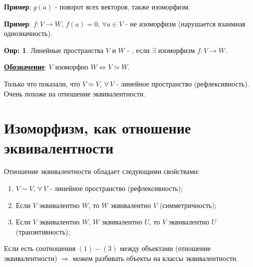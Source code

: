 \documentclass[12pt]{article}
\theoremstyle{definition}
\newtheorem{defn}{Опр:}
\begin{document}
\textbf{Пример}: $g(a)$ - поворот всех векторов, также изоморфизм.

\textbf{Пример}: $f\colon V \to W, \, f(a) = 0, \, \forall a \in V$ - не изоморфизм (нарушается взаимная однозначность).

\begin{defn}
	Линейные пространства $V$ и $W$ - , если $\exists$ изоморфизм $f \colon V \to W$.
\end{defn}

\uline{\textbf{Обозначение}}: $V$ изоморфно $W \Leftrightarrow V \simeq W$.

Только что показали, что $V \simeq V, \, \forall \, V$ - линейное пространство (рефлексивность).
Очень похоже на отношение эквивалентности.

\newpage
\section*{Изоморфизм, как отношение эквивалентности}
Отношение эквивалентности обладает следующими свойствами:
\begin{enumerate}[label ={(\arabic*)}]
	\item $V \sim V, \, \forall\, V$ - линейное пространство (рефлексивность);
	\item Если $V$ эквивалентно $W$, то $W$ эквивалентно $V$ (симметричность);
	\item Если $V$ эквивалентно $W$, $W$ эквивалентно $U$, то $V$ эквивалентно $U$ (транзитивность);
\end{enumerate}
Если есть соотношения $(1)-(3)$ между объектами (отношение эквивалентности) $\Rightarrow$ можем разбивать объекты на классы эквивалентности.
\end{document}
